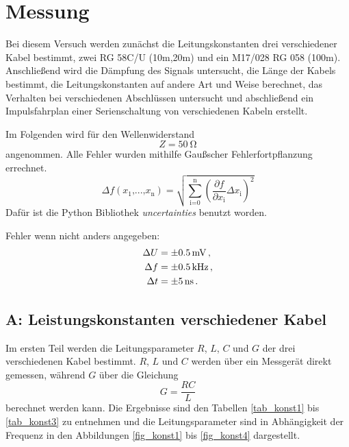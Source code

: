 \FloatBarrier
\section{Messung} %
\label{sec:section_name}

Bei diesem Versuch werden zunächst die Leitungskonstanten drei verschiedener Kabel bestimmt, zwei RG 58C/U (10m,20m) und ein M17/028 RG 058 (100m).
Anschließend wird die Dämpfung des Signals untersucht, die Länge der Kabels bestimmt, die Leitungskonstanten auf andere Art und Weise berechnet, das Verhalten bei verschiedenen Abschlüssen untersucht und abschließend ein Impulsfahrplan einer Serienschaltung von verschiedenen Kabeln erstellt.

Im Folgenden wird für den Wellenwiderstand
\begin{equation*}
	Z = \SI{50}{\ohm}
\end{equation*}
angenommen.
Alle Fehler wurden mithilfe Gaußscher Fehlerfortpflanzung errechnet.
\begin{equation*}
	\Delta f(x_\text{1}\text{,...,}x_\text{n}) = \sqrt{\sum_\text{i=0}^\text{n} \left(\frac{\partial f}{\partial x_\text{i}} \Delta x_\text{i}\right)^2}
\end{equation*}
Dafür ist die Python Bibliothek \textit{uncertainties} benutzt worden.

Fehler wenn nicht anders angegeben:
\begin{align*}
    \Delta U &= \SI{+-0.5}{\milli\volt}\,, \\
    \Delta f &= \SI{+-0.5}{\kilo\hertz}\,,\\
	\Delta t &= \SI{+-5}{\nano\second}\,.
\end{align*}

\subsection{A: Leistungskonstanten verschiedener Kabel} %
\label{sub:a_}


Im ersten Teil werden die Leitungsparameter $R$, $L$, $C$ und $G$ der drei verschiedenen Kabel bestimmt.
$R$, $L$ und $C$ werden über ein Messgerät direkt gemessen, während $G$ über die Gleichung
\begin{equation*}
	G = \frac{R C}{L}
\end{equation*}
berechnet werden kann.
Die Ergebnisse sind den Tabellen \ref{tab_konst1} bis \ref{tab_konst3} zu entnehmen und die Leitungsparameter sind in Abhängigkeit der Frequenz in den Abbildungen \ref{fig_konst1} bis \ref{fig_konst4} dargestellt.


